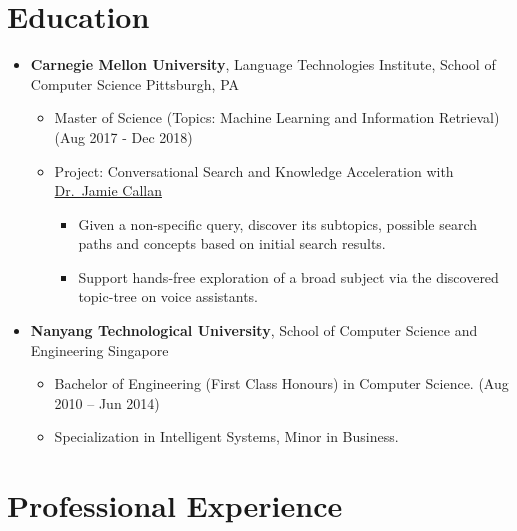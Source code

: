 
\section{Education}\label{education}

\begin{itemize}
\tightlist
\item
  \textbf{Carnegie Mellon University}, Language Technologies Institute,
  School of Computer Science \hfill Pittsburgh, PA

  \begin{itemize}
  \tightlist
  \item
    Master of Science (Topics: Machine Learning and Information
    Retrieval) \hfill (Aug 2017 - Dec 2018)
  \item
    Project: Conversational Search and Knowledge Acceleration with
    \href{http://www.cs.cmu.edu/~callan/}{Dr.~Jamie Callan}

    \begin{itemize}
    \tightlist
    \item
      Given a non-specific query, discover its subtopics, possible
      search paths and concepts based on initial search results.
    \item
      Support hands-free exploration of a broad subject via the
      discovered topic-tree on voice assistants.
    \end{itemize}
  \end{itemize}
\item
  \textbf{Nanyang Technological University}, School of Computer Science
  and Engineering \hfill Singapore

  \begin{itemize}
  \tightlist
  \item
    Bachelor of Engineering (First Class Honours) in Computer Science.
    \hfill (Aug 2010 -- Jun 2014)
  \item
    Specialization in Intelligent Systems, Minor in Business.
  \end{itemize}
\end{itemize}

\section{Professional Experience}\label{professional-experience}

